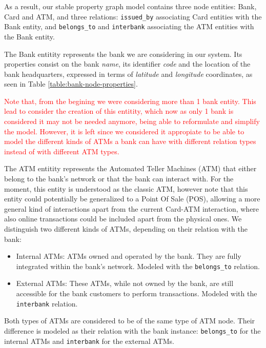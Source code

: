 \documentclass{article}
\begin{document}
As a result, our stable property graph model contains three node entities: Bank, Card and ATM, and three relations: \texttt{issued\_by} associating Card entities with the Bank entity, and \texttt{belongs\_to} and \texttt{interbank} associating the ATM entities with the Bank entity. 

The Bank entitity represents the bank we are considering in our system. Its properties consist
on the bank \emph{name}, its identifier \emph{code} and the location
of the bank headquarters, expressed in terms of \emph{latitude} and \emph{longitude}
coordinates, as seen in Table \ref{table:bank-node-properties}.
  


\begin{tcolorbox}
\textcolor{red}{Note that, from the begining we were considering more than 1 bank entity. This lead to consider the creation of this entitity, which now as only 1 bank is considered it may not be needed anymore, being able to reformulate and simplify the model. However, it is left since we considered it appropiate to be able to model the different kinds of ATMs a bank can have with different relation types instead of with different ATM types.}
\end{tcolorbox}

The ATM entitity represents the Automated Teller Machines (ATM) that either belong to the bank's network or that the bank can interact with.
For the moment, this entity is understood as the classic ATM, however note that this entity could potentially be generalized to a Point Of Sale (POS), allowing a more general kind of interactions apart from the current Card-ATM interaction, where also online transactions could be included apart from the physical ones. We distinguish two different kinds of ATMs, depending on their relation with the bank:

\begin{itemize}
  \item Internal ATMs: ATMs owned and operated by the bank. They are fully integrated within the
  bank's network. Modeled with the \texttt{belongs\_to} relation.
  \item External ATMs: These ATMs, while not owned by the bank, are still accessible for the bank
  customers to perform transactions. Modeled with the \texttt{interbank} relation. 
\end{itemize}

Both types of ATMs are considered to be of the same type of ATM node. Their difference
is modeled as their relation with the bank instance: \texttt{belongs\_to} for the internal ATMs and \texttt{interbank} for the external ATMs.
\end{document}
